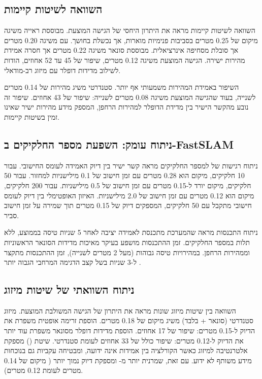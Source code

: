 \subsection{השוואה לשיטות קיימות}
\label{sec:ch08_comparison_existing}

השוואה לשיטות קיימות מראה את היתרון היחסי של הגישה המוצעת.  מבוססת ראייה משיגה  מיקום של 0.25 מטרים בסביבות פנימיות מוארות, אך נכשלת בחושך.  עם  משיגה 0.20 מטרים אך סובלת מסחיפה אינרציאלית.  מבוססת סונאר משיגה 0.22 מטרים אך חסרה אמידת מהירות ישירה. הגישה המוצעת משיגה 0.12 מטרים, שיפור של 45 עד 52 אחוזים, הודות לשילוב מדידות דופלר עם מיזוג רב-מודאלי.

השיפור באמידת המהירות משמעותי אף יותר.  סטנדרטי משיג  מהירות של 0.14 מטרים לשנייה, בעוד שהגישה המוצעת משיגה 0.08 מטרים לשנייה: שיפור של 43 אחוזים. שיפור זה נובע מהקשר הישיר בין מדידת הדופלר למהירות הרחפן, המספק מידע מהירות ישיר שאינו זמין בשיטות קיימות.

\subsection{ניתוח עומק: השפעת מספר החלקיקים ב-FastSLAM}
\label{sec:ch08_particle_analysis}

ניתוח רגישות של  למספר החלקיקים מראה קשר ישיר בין דיוק האמידה לעומס החישובי. עבור 10 חלקיקים,  מיקום הוא 0.28 מטרים עם זמן חישוב של 0.1 מילישניות למחזור. עבור 50 חלקיקים,  מיקום יורד ל-0.15 מטרים עם זמן חישוב של 0.5 מילישניות. עבור 200 חלקיקים,  מיקום הוא 0.12 מטרים עם זמן חישוב של 2.0 מילישניות. האיזון האופטימלי בין דיוק לעומס חישובי מתקבל עם 50 חלקיקים, המספקים דיוק של 0.15 מטרים תוך שמירה על זמן חישוב סביר.

ניתוח התכנסות מראה שהמערכת מתכנסת לאמידה יציבה לאחר 5 שניות טיסה בממוצע, ללא תלות במספר החלקיקים. זמן ההתכנסות מושפע בעיקר מאיכות מדידות הסונאר הראשוניות וממהירות הרחפן. במהירויות טיסה גבוהות (מעל 2 מטרים לשנייה), זמן ההתכנסות מתקצר ל-3 שניות בשל קצב הדגימה המרחבי הגבוה יותר \cite{Dissanayake2001SLAM, Montemerlo2002FastSLAM, Thrun2005ProbRobotics, Chen2020BioSonar, Julier1997CovarianceIntersection}.

\subsection{ניתוח השוואתי של שיטות מיזוג}
\label{sec:ch08_fusion_comparison}

השוואה בין שיטות מיזוג שונות מראה את היתרון של הגישה המשולבת המוצעת. מיזוג  סטנדרטי (סונאר +  בלבד) משיג  מיקום של 0.18 מטרים. הוספת זרימה אופטית משפרת את הדיוק ל-0.15 מטרים: שיפור של 17 אחוזים. הוספת מדידות דופלר מסונאר משפרת עוד יותר את הדיוק ל-0.12 מטרים: שיפור כולל של 33 אחוזים לעומת  סטנדרטי. שיטת  () \cite{Julier1997CovarianceIntersection} מספקת אלטרנטיבה למיזוג כאשר הקורלציה בין אמידות אינה ידועה, ומבטיחה עקביות גם בנוכחות מידע משותף לא ידוע. עם זאת,  שמרנית יותר מ- ומספקת דיוק נמוך יותר ( מיקום של 0.14 מטרים לעומת 0.12 מטרים).

